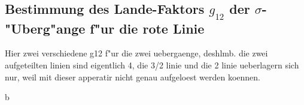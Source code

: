   \subsection{\texorpdfstring{Bestimmung des Lande-Faktors $g_{12}$ der $\sigma$-"Uberg"ange f"ur die rote Linie}{Bestimmung des Lande-Faktors g_{12} der sigma-"Uberg"ange f"ur die rote Linie}}




    Hier zwei verschiedene g12 f"ur die zwei  uebergaenge, deshlmb. die zwei aufgeteilten linien sind eigentlich 4, die 3/2 linie und die 2 linie ueberlagern sich nur, weil mit dieser apperatir nicht genau aufgeloest werden koennen.
























b
